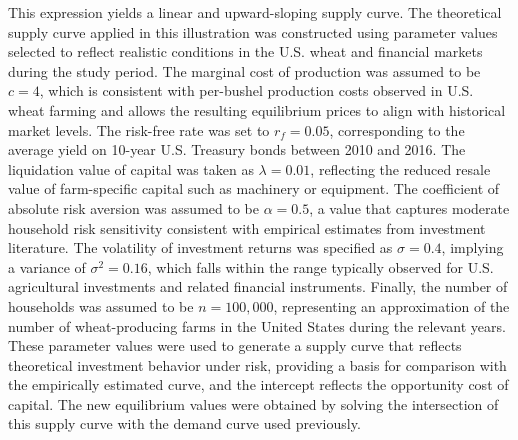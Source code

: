 \documentclass[12pt,a4paper]{article}%
\begin{document}
This expression yields a linear and upward-sloping supply curve. The theoretical supply curve applied in this illustration was constructed using parameter values selected to reflect realistic conditions in the U.S. wheat and financial markets during the study period. The marginal cost of production was assumed to be $c = 4$, which is consistent with per-bushel production costs observed in U.S. wheat farming and allows the resulting equilibrium prices to align with historical market levels. The risk-free rate was set to $r_f = 0.05$, corresponding to the average yield on 10-year U.S. Treasury bonds between 2010 and 2016. The liquidation value of capital was taken as $\lambda = 0.01$, reflecting the reduced resale value of farm-specific capital such as machinery or equipment. The coefficient of absolute risk aversion was assumed to be $\alpha = 0.5$, a value that captures moderate household risk sensitivity consistent with empirical estimates from investment literature. The volatility of investment returns was specified as $\sigma = 0.4$, implying a variance of $\sigma^2 = 0.16$, which falls within the range typically observed for U.S. agricultural investments and related financial instruments. Finally, the number of households was assumed to be $n = 100{,}000$, representing an approximation of the number of wheat-producing farms in the United States during the relevant years. These parameter values were used to generate a supply curve that reflects theoretical investment behavior under risk, providing a basis for comparison with the empirically estimated curve, and the intercept reflects the opportunity cost of capital. The new equilibrium values were obtained by solving the intersection of this supply curve with the demand curve used previously.
\end{document}
